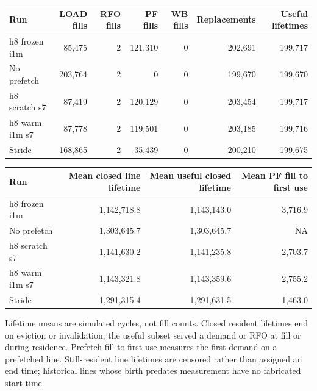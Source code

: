 \documentclass[10pt]{article}
\begin{document}
\begin{center}
\scriptsize
\begin{longtable}{lrrrrrr}
\toprule
Run & LOAD fills & RFO fills & PF fills & WB fills & Replacements & Useful lifetimes \\
\midrule
\endhead
h8 frozen i1m & 85,475 & 2 & 121,310 & 0 & 202,691 & 199,717 \\
No prefetch & 203,764 & 2 & 0 & 0 & 199,670 & 199,670 \\
h8 scratch s7 & 87,419 & 2 & 120,129 & 0 & 203,454 & 199,717 \\
h8 warm i1m s7 & 87,778 & 2 & 119,501 & 0 & 203,185 & 199,716 \\
Stride & 168,865 & 2 & 35,439 & 0 & 200,210 & 199,675 \\
\bottomrule
\end{longtable}
\end{center}

\begin{center}
\scriptsize
\begin{longtable}{lrrr}
\toprule
Run & Mean closed line lifetime & Mean useful closed lifetime & Mean PF fill to first use \\
\midrule
\endhead
h8 frozen i1m & 1,142,718.8 & 1,143,143.0 & 3,716.9 \\
No prefetch & 1,303,645.7 & 1,303,645.7 & NA \\
h8 scratch s7 & 1,141,630.2 & 1,141,235.8 & 2,703.7 \\
h8 warm i1m s7 & 1,143,321.8 & 1,143,359.6 & 2,755.2 \\
Stride & 1,291,315.4 & 1,291,631.5 & 1,463.0 \\
\bottomrule
\end{longtable}
\end{center}

Lifetime means are simulated cycles, not fill counts. Closed resident lifetimes end on eviction or invalidation; the useful subset served a demand or RFO at fill or during residence. Prefetch fill-to-first-use measures the first demand on a prefetched line. Still-resident line lifetimes are censored rather than assigned an end time; historical lines whose birth predates measurement have no fabricated start time.
\end{document}
